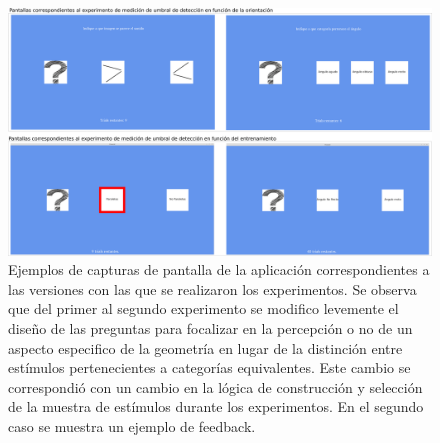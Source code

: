 \documentclass{article}
\begin{document}
    \begin{figure}
        \center
        \includegraphics[width=\textwidth]{Imagenes/Pantallas2.png}
        \caption{Ejemplos de  capturas de pantalla de la aplicación correspondientes a las versiones con las que se realizaron los experimentos. Se observa que del primer al segundo experimento se modifico levemente el diseño de las preguntas para focalizar en la percepción o no de un aspecto especifico de la geometría en lugar de la distinción entre estímulos pertenecientes a categorías equivalentes. Este cambio se correspondió con un cambio en la lógica de construcción y selección de la muestra de estímulos durante los experimentos. En el segundo caso se muestra un ejemplo de feedback.}
        
        \label{fig:Pantallas2}
    \end{figure}
    
    
\clearpage
\end{document}
